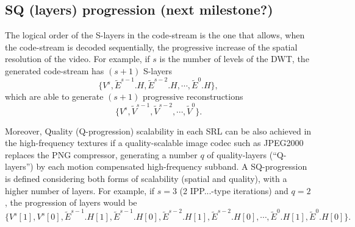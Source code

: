 \subsection{SQ (layers) progression (next milestone?)}
The logical order of the S-layers in the code-stream is the one that
allows, when the code-stream is decoded sequentially, the progressive
increase of the spatial resolution of the video. For example, if
$s$ is the number of levels of the DWT, the generated
code-stream has $(s+1)$ S-layers
\begin{equation*}
  \{V^s,\tilde{E}^{s-1}.H,\tilde{E}^{s-2}.H,\cdots,\tilde{E}^0.H\},
\end{equation*}
which are able to generate $(s+1)$ progressive
reconstructions
\begin{equation*}
  \{V^s,\tilde{V}^{s-1},\tilde{V}^{s-2},\cdots,\tilde{V}^0\}.
\end{equation*}

Moreover, Quality (Q-progression) scalability in each SRL can be also
achieved in the high-frequency textures if a quality-scalable image
codec such as JPEG2000~\cite{taubman2002jpeg2000} replaces the PNG
compressor, generating a number $q$ of quality-layers (``Q-layers'')
by each motion compensated high-frequency subband. A SQ-progression is
defined considering both forms of scalability (spatial and quality),
with a higher number of layers. For example, if $s=3$ (2 IPP...-type
iterations) and $q=2$, the progression of layers would be
\begin{equation*}
  \{V^s[1],V^s[0],\tilde{E}^{s-1}.H[1],\tilde{E}^{s-1}.H[0],\tilde{E}^{s-2}.H[1],\tilde{E}^{s-2}.H[0],\cdots,\tilde{E}^0.H[1],\tilde{E}^0.H[0]\}.
\end{equation*}


